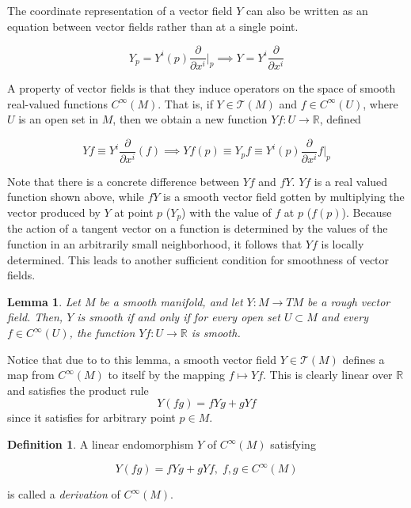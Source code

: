 \documentclass{article}
\newtheorem{lemma}[theorem]{Lemma}
\theoremstyle{remark}
\theoremstyle{definition}
\newtheorem{definition}{Definition}[section]
\begin{document}
    The coordinate representation of a vector field $Y$ can also be written as an equation between vector fields rather than at a single point.

      \[Y_p = Y^i (p) \frac{\partial}{\partial x^i} \bigg|_p \implies Y = Y^i \frac{\partial}{\partial x^i} \]

    A property of vector fields is that they induce operators on the space of smooth real-valued functions $C^\infty (M)$. That is, if $Y \in \mathcal{T}(M)$ and $f \in C^\infty (U)$, where $U$ is an open set in $M$, then we obtain a new function $Y f: U \longrightarrow \mathbb{R}$, defined 

      \[Y f \equiv Y^i \frac{\partial}{\partial x^i} (f) \implies Y f(p) \equiv Y_p f \equiv Y^i (p) \frac{\partial}{\partial x^i} f \bigg|_p \]

    Note that there is a concrete difference between $Y f$ and $f Y$. $Y f$ is a real valued function shown above, while $f Y$ is a smooth vector field gotten by multiplying the vector produced by $Y$ at point $p$ ($Y_p$) with the value of $f$ at $p$ ($f(p)$). Because the action of a tangent vector on a function is determined by the values of the function in an arbitrarily small neighborhood, it follows that $Y f$ is locally determined. This leads to another sufficient condition for smoothness of vector fields. 

    \begin{lemma}
      Let $M$ be a smooth manifold, and let $Y: M \longrightarrow TM$ be a rough vector field. Then, $Y$ is smooth if and only if for every open set $U \subset M$ and every $f \in C^\infty (U)$, the function $Y f: U \longrightarrow \mathbb{R}$ is smooth. 
    \end{lemma}

    Notice that due to to this lemma, a smooth vector field $Y \in \mathcal{T}(M)$ defines a map from $C^\infty(M)$ to itself by the mapping $f \mapsto Y f$. This is clearly linear over $\mathbb{R}$ and satisfies the product rule 
      \[Y(f g) = f Y g + g Y f\]
    since it satisfies for arbitrary point $p \in M$. 

    \begin{definition}
      A linear endomorphism $Y$ of $C^\infty (M)$ satisfying 

        \[Y(f g) = f Y g + g Y f, \; f, g \in C^\infty(M)\]

      is called a \textit{derivation} of $C^\infty (M)$. 
    \end{definition}
\end{document}
